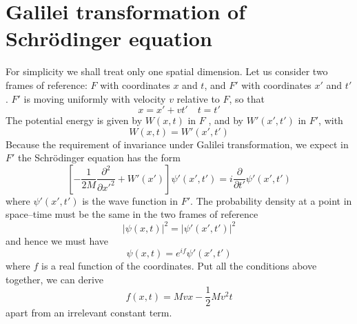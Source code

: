 \section{Galilei transformation of Schr\"{o}dinger equation}
For simplicity we shall treat only one spatial dimension. Let us consider two frames of reference: $F$ with coordinates $x$ and $t$, and $F'$ with coordinates $x'$ and $t'$. $F'$ is moving uniformly with velocity $v$ relative to $F$, so that
\[x = x' + vt' \quad t=t'\]
The potential energy is given by $W(x,t)$ in $F$ , and by $W'(x',t')$ in $F'$, with
\[W(x,t) = W'(x',t')\]
Because the requirement of invariance under Galilei transformation, we expect in $F'$ the  Schr\"{o}dinger equation has the form
\[ \left[- \frac{1}{2M} \frac{\partial^2}{\partial x'^2} + W'(x') \right] \psi'(x',t') = i\frac{\partial}{\partial t'}\psi'(x',t')\]
where $\psi'(x',t')$ is the wave function in $F'$.
The probability density at a point in space–time must be the same in the two frames of reference
\[|\psi(x,t)|^2 = |\psi'(x',t')|^2\]
and hence we must have
\[\psi(x,t) = e^{if}\psi'(x',t')\]
where $f$ is a real function of the coordinates.
Put all the conditions above together, we can derive
\[f(x,t) = Mvx - \frac{1}{2} Mv^2t\]
apart from an irrelevant constant term.

